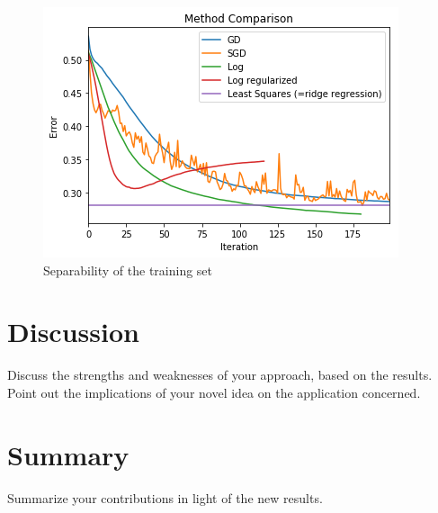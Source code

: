 \documentclass[10pt,conference,compsocconf]{IEEEtran}
\begin{document}
\begin{tiny}
	\begin{figure}[b]
		\includegraphics[scale=0.5]{MethodComp.png}   
		\caption{Separability of the training set }
		\label{fig3}    
	\end{figure}
\end{tiny}
\section{Discussion}
\label{S1}
  Discuss the strengths and weaknesses of your
approach, based on the results. Point out the implications of your
novel idea on the application concerned.
\section{Summary}
\label{S1}
  Summarize your contributions in light of the new
results.
\end{document}
